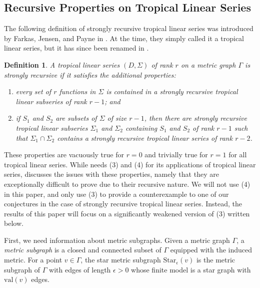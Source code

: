 \documentclass{amsart}
\newtheorem{definition}[theorem]{Definition}
\begin{document}
	\subsection{Recursive Properties on Tropical Linear Series}
	\label{Subsec:SRTLS}
	
	The following definition of strongly recursive tropical linear series was introduced by Farkas, Jensen, and Payne in \cite{farkas2025kodairadimensionsoverlinemathcalm22overlinemathcalm23}. At the time, they simply called it a tropical linear series, but it has since been renamed in \cite{chang2025matroidal}.
	
	\begin{definition}\cite[Definition~1.19]{chang2025matroidal}
		\label{Def:Strongly-Recursive-Linear-Series}
		A tropical linear series $(D,\Sigma)$ of rank $r$ on a metric graph $\Gamma$ is strongly recursive if it satisfies the additional properties:
		\begin{enumerate}
			\item [(3)] every set of $r$ functions in $\Sigma$ is contained in a strongly recursive tropical linear subseries of rank $r-1$; and
			\item [(4)] if $S_1$ and $S_2$ are subsets of $\Sigma$ of size $r-1$, then there are strongly recursive tropical linear subseries $\Sigma_1$ and $\Sigma_2$ containing $S_1$ and $S_2$ of rank $r-1$ such that $\Sigma_1 \cap \Sigma_2$ contains a strongly recursive tropical linear series of rank $r-2$.
		\end{enumerate}
	\end{definition}
	
	These properties are vacuously true for $r=0$ and trivially true for $r=1$ for all tropical linear series. While \cite{farkas2025kodairadimensionsoverlinemathcalm22overlinemathcalm23} needs (3) and (4) for its applications of tropical linear series, \cite{chang2025matroidal} discusses the issues with these properties, namely that they are exceptionally difficult to prove due to their recursive nature. We will not use (4) in this paper, and only use (3) to provide a counterexample to one of our conjectures in the case of strongly recursive tropical linear series. Instead, the results of this paper will focus on a significantly weakened version of (3) written below. 
	
	First, we need information about metric subgraphs. Given a metric graph $\Gamma$, a \textit{metric subgraph} is a closed and connected subset of $\Gamma$ equipped with the induced metric. For a point $v \in \Gamma$, the star metric subgraph $\mathrm{Star}_{\epsilon}(v)$ is the metric subgraph of $\Gamma$ with edges of length $\epsilon > 0$ whose finite model is a star graph with $\mathrm{val}(v)$ edges.
	
\end{document}
